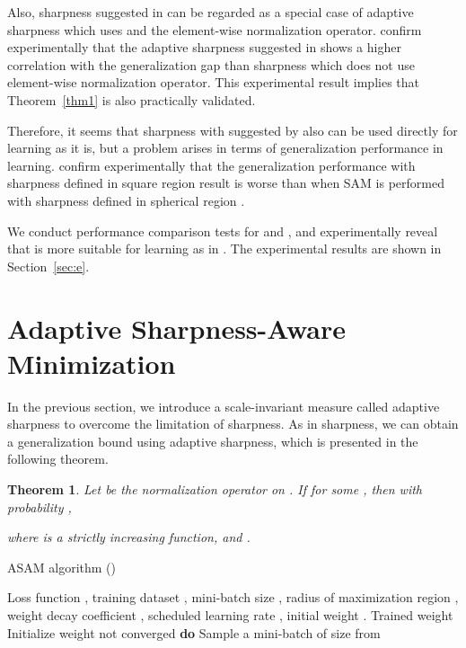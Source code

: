 \documentclass{article}
\newtheorem{thm}{Theorem}
\begin{document}
Also, sharpness suggested in \citet{keskar2017large} can be regarded as a special case of adaptive sharpness which uses  and the element-wise normalization operator.
\citet{jiang2019fantastic} confirm experimentally that the adaptive sharpness suggested in \citet{keskar2017large} shows a higher correlation with the generalization gap than sharpness which does not use element-wise normalization operator.
This experimental result implies that Theorem~\ref{thm1} is also practically validated.

Therefore, it seems that sharpness with  suggested by \citet{keskar2017large} also can be used directly for learning as it is, but a problem arises in terms of generalization performance in learning. \citet{foret2021sharpnessaware} confirm experimentally that the generalization performance with sharpness defined in square region  result is worse than when SAM is performed with sharpness defined in spherical region .

We conduct performance comparison tests for  and , and experimentally reveal that  is more suitable for learning as in \citet{foret2021sharpnessaware}. The experimental results are shown in Section~\ref{sec:e}.


\section{Adaptive Sharpness-Aware Minimization} \label{sec:a}

In the previous section, we introduce a scale-invariant measure called adaptive sharpness to overcome the limitation of sharpness.
As in sharpness, we can obtain a generalization bound using adaptive sharpness, which is presented in the following theorem.
\begin{thm}\label{thm2}
Let  be the normalization operator on .
If  for some ,
then with probability , 

where  is a strictly increasing function,  and .
\end{thm}


\begin{algorithm}[tb]
   \caption{ASAM algorithm ()}
   \label{alg1}
\begin{algorithmic}
    Loss function , training dataset , mini-batch size , radius of maximization region , weight decay coefficient , scheduled learning rate , initial weight .
    Trained weight 
   \STATE Initialize weight 
    not converged  {\bfseries do} 
   \STATE   \hspace{0.05\linewidth} Sample a mini-batch  of size  from 
   \STATE   \hspace{0.05\linewidth} 
   \STATE   \hspace{0.05\linewidth} 
\end{algorithmic}
\end{algorithm}
\end{document}
